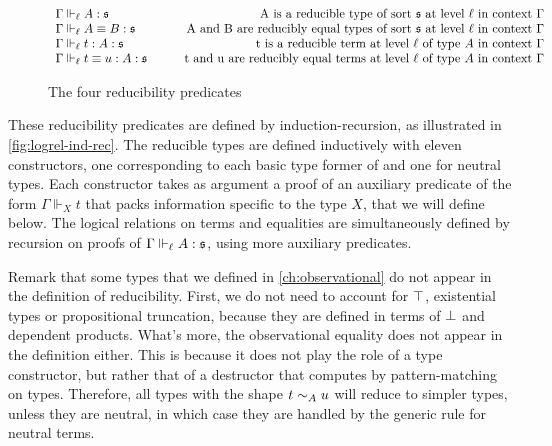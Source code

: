 \begin{figure*}[!h]
  \[
\begin{array}{lr}
  \tytyR{\ell}{\Gamma}{A}{\Univ} & \text{A is a reducible type of sort \( \Univ \) at level \( \ell \) in context \( \Gamma \)} \\
  \eqtyR{\ell}{\Gamma}{A}{B}{\Univ} & \text{A and B are reducibly equal types of sort \( \Univ \) at level \( \ell \) in context \( \Gamma \)} \\
  \tytmR{\ell}{\Gamma}{t}{A}{\Univ} & \text{t is a reducible term at level \( \ell \) of type \( A \) in context \( \Gamma \)} \\
  \eqtmR{\ell}{\Gamma}{t}{u}{A}{\Univ} & \qquad\text{t and u are reducibly equal terms at level \( \ell \) of type \( A \) in context \( \Gamma \)}
\end{array}
\]
\caption{The four reducibility predicates}
\label{fig:log-rel-judgments}
\end{figure*}

These reducibility predicates are defined by induction-recursion, as 
illustrated in \cref{fig:logrel-ind-rec}.
%
The reducible types are defined inductively with eleven constructors, one 
corresponding to each basic type former of \SetoidCC and one for neutral types. 
% 
Each constructor takes as argument a proof of an auxiliary predicate of the 
form \( \Gamma \Vdash_X t \) that packs information specific to the 
type \( X \), that we will define below.
%
% 
The logical relations on terms and equalities are simultaneously
defined by recursion on proofs of \( \tytyR{\ell}{\Gamma}{A}{\Univ} \), using
more auxiliary predicates.

Remark that some types that we defined in \cref{ch:observational} do not appear 
in the definition of reducibility.
% 
First, we do not need to account for \( \Unit \), existential types 
or propositional truncation, because they are defined in terms of \( \Empty \)
and dependent products.
%
What's more, the observational equality does not appear in the definition
either.
This is because it does not play the role of a type constructor, but
rather that of a destructor that computes by pattern-matching on types.
Therefore, all types with the shape \( \Obseq[A]{t}{u} \) will reduce to
simpler types, unless they are neutral, in which case they are handled
by the generic rule for neutral terms.


